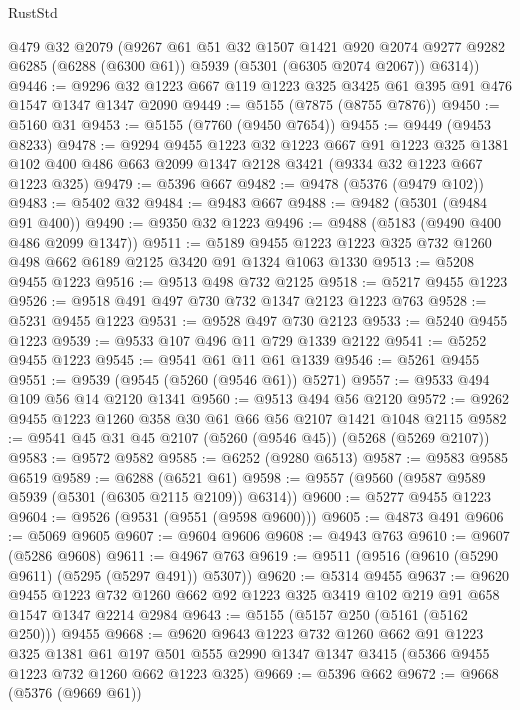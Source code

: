 \begin{lexlean}{RustStd}
\begin{coremodule}
      @479
      @32
      @2079
      (@9267
        @61
        @51
        @32
        @1507
        @1421
        @920
        @2074
        @9277
        @9282
        @6285
        (@6288 (@6300 @61))
        @5939
        (@5301 (@6305 @2074 @2067))
        @6314))
@9446 := @9296 @32 @1223 @667 @119 @1223 @325 @3425 @61 @395 @91 @476 @1547 @1347 @1347 @2090
@9449 := @5155 (@7875 (@8755 @7876))
@9450 := @5160 @31
@9453 := @5155 (@7760 (@9450 @7654))
@9455 := @9449 (@9453 @8233)
@9478 := @9294
    @9455
    @1223
    @32
    @1223
    @667
    @91
    @1223
    @325
    @1381
    @102
    @400
    @486
    @663
    @2099
    @1347
    @2128
    @3421
    (@9334 @32 @1223 @667 @1223 @325)
@9479 := @5396 @667
@9482 := @9478 (@5376 (@9479 @102))
@9483 := @5402 @32
@9484 := @9483 @667
@9488 := @9482 (@5301 (@9484 @91 @400))
@9490 := @9350 @32 @1223
@9496 := @9488 (@5183 (@9490 @400 @486 @2099 @1347))
@9511 := @5189 @9455 @1223 @1223 @325 @732 @1260 @498 @662 @6189 @2125 @3420 @91 @1324 @1063 @1330
@9513 := @5208 @9455 @1223
@9516 := @9513 @498 @732 @2125
@9518 := @5217 @9455 @1223
@9526 := @9518 @491 @497 @730 @732 @1347 @2123 @1223 @763
@9528 := @5231 @9455 @1223
@9531 := @9528 @497 @730 @2123
@9533 := @5240 @9455 @1223
@9539 := @9533 @107 @496 @11 @729 @1339 @2122
@9541 := @5252 @9455 @1223
@9545 := @9541 @61 @11 @61 @1339
@9546 := @5261 @9455
@9551 := @9539 (@9545 (@5260 (@9546 @61)) @5271)
@9557 := @9533 @494 @109 @56 @14 @2120 @1341
@9560 := @9513 @494 @56 @2120
@9572 := @9262 @9455 @1223 @1260 @358 @30 @61 @66 @56 @2107 @1421 @1048 @2115
@9582 := @9541 @45 @31 @45 @2107 (@5260 (@9546 @45)) (@5268 (@5269 @2107))
@9583 := @9572 @9582
@9585 := @6252 (@9280 @6513)
@9587 := @9583 @9585 @6519
@9589 := @6288 (@6521 @61)
@9598 := @9557 (@9560 (@9587 @9589 @5939 (@5301 (@6305 @2115 @2109)) @6314))
@9600 := @5277 @9455 @1223
@9604 := @9526 (@9531 (@9551 (@9598 @9600)))
@9605 := @4873 @491
@9606 := @5069 @9605
@9607 := @9604 @9606
@9608 := @4943 @763
@9610 := @9607 (@5286 @9608)
@9611 := @4967 @763
@9619 := @9511 (@9516 (@9610 (@5290 @9611) (@5295 (@5297 @491)) @5307))
@9620 := @5314 @9455
@9637 := @9620
    @9455
    @1223
    @732
    @1260
    @662
    @92
    @1223
    @325
    @3419
    @102
    @219
    @91
    @658
    @1547
    @1347
    @2214
    @2984
@9643 := @5155 (@5157 @250 (@5161 (@5162 @250))) @9455
@9668 := @9620
    @9643
    @1223
    @732
    @1260
    @662
    @91
    @1223
    @325
    @1381
    @61
    @197
    @501
    @555
    @2990
    @1347
    @1347
    @3415
    (@5366 @9455 @1223 @732 @1260 @662 @1223 @325)
@9669 := @5396 @662
@9672 := @9668 (@5376 (@9669 @61))

\end{coremodule}
\end{lexlean}
